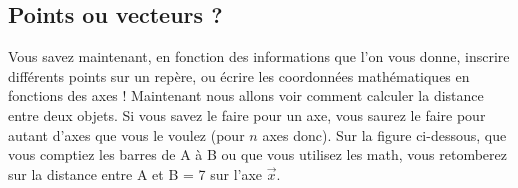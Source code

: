 \documentclass[
	11pt, %
	fleqn, %
	a4paper, %
]{LegrandOrangeBook}
\begin{document}
\subsection{Points ou vecteurs ?}
Vous savez maintenant, en fonction des informations que l'on vous donne, inscrire différents points sur un repère, ou écrire les coordonnées mathématiques en fonctions des axes ! Maintenant nous allons voir comment calculer la distance entre deux objets. Si vous savez le faire pour un axe, vous saurez le faire pour autant d'axes que vous le voulez (pour $n$ axes donc). Sur la figure ci-dessous, que vous comptiez les barres de A à B ou que vous utilisez les math, vous retomberez sur la distance entre A et B = 7 sur l'axe $\vec{x}$.



\end{document}
